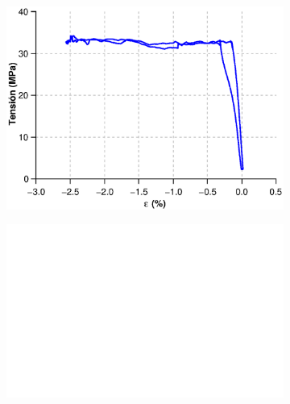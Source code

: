 \documentclass[a4paper,12pt,fleqn,twoside,openany]{book}
\begin{document}
\begin{figure}%
    \centering
    ~ %
         \begin{subfigure}{0.4\textwidth}
        \includegraphics[width=\textwidth]{Img/Resultados/Resistencia/EjTensionDef.eps}
        \caption{}%
        \label{fig: EjTensionDef}
    \end{subfigure}
        \begin{subfigure}{0.4\textwidth}
        \includegraphics[width=\textwidth]{Img/Resultados/Resistencia/Ejblanco.jpg}
        \label{fig:EjTensionDef}
    \end{subfigure}    
 \begin{subfigure}{0.4\textwidth}

\end{subfigure}
\end{figure}
\end{document}
